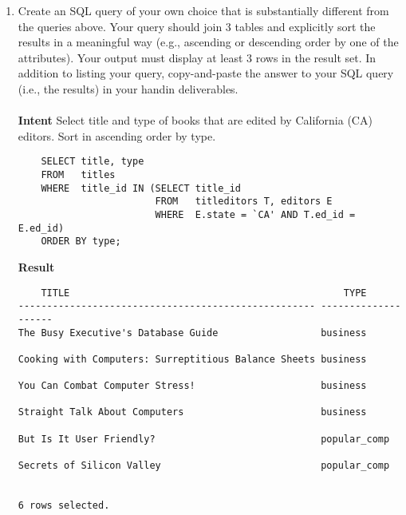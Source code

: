 \documentclass{article}
\begin{document}
\begin{enumerate}
\item Create an SQL query of your own choice that is substantially different from the queries above. Your query should join 3 tables and explicitly sort the results in a meaningful way (e.g., ascending or descending order by one of the attributes). Your output must display at least 3 rows in the result set. In addition to listing your query, copy-and-paste the answer to your SQL query (i.e., the results) in your handin deliverables.\\
	\\
	\textbf{Intent} Select title and type of books that are edited by California (CA) editors. Sort in ascending order by type.
	\begin{verbatim}
	SELECT title, type
	FROM   titles
	WHERE  title_id IN (SELECT title_id
	                    FROM   titleditors T, editors E
	                    WHERE  E.state = `CA' AND T.ed_id = E.ed_id)
	ORDER BY type;
	\end{verbatim}
	\textbf{Result}
	\begin{verbatim}
	TITLE                                                TYPE
---------------------------------------------------- --------------------
The Busy Executive's Database Guide                  business
   
Cooking with Computers: Surreptitious Balance Sheets business

You Can Combat Computer Stress!                      business

Straight Talk About Computers                        business

But Is It User Friendly?                             popular_comp

Secrets of Silicon Valley                            popular_comp


6 rows selected.

	\end{verbatim}
	
\end{enumerate}
\end{document}
